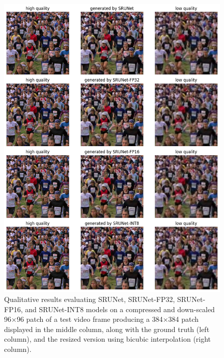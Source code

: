 \begin{figure}[ht]
\includegraphics[width=1.0\textwidth]{static/02_srunet_qualitative_results.png}
\caption{Qualitative results evaluating SRUNet, SRUNet-FP32, SRUNet-FP16, and SRUNet-INT8 models on a compressed and down-scaled 96$\times$96 patch of a test video frame producing a 384$\times$384 patch displayed in the middle column, along with the ground truth (left column), and the resized version using bicubic interpolation (right column).}
\label{fig:crowd-qualitative-srunet}
\end{figure}

